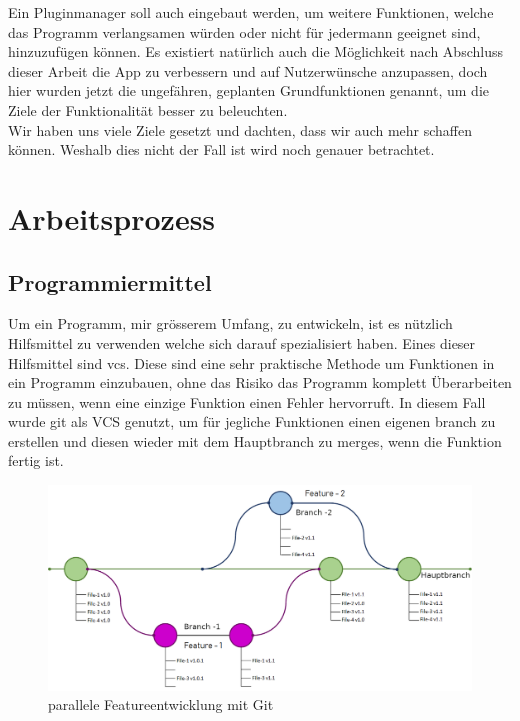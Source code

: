 \documentclass[a4paper,11pt]{article}
\begin{document}
Ein Pluginmanager soll auch eingebaut werden, um weitere Funktionen, welche das Programm verlangsamen würden oder nicht für jedermann geeignet sind, hinzuzufügen können. Es existiert natürlich auch die Möglichkeit nach Abschluss dieser Arbeit die App zu verbessern und auf Nutzerwünsche anzupassen, doch hier wurden jetzt die ungefähren, geplanten Grundfunktionen genannt, um die Ziele der Funktionalität besser zu beleuchten.\\
Wir haben uns viele Ziele gesetzt und dachten, dass wir auch mehr schaffen können. Weshalb dies nicht der Fall ist wird noch genauer betrachtet. 

\newpage

\section{Arbeitsprozess}

\subsection{Programmiermittel}

Um ein Programm, mir grösserem Umfang, zu entwickeln, ist es nützlich Hilfsmittel zu verwenden welche sich darauf spezialisiert haben. 
Eines dieser Hilfsmittel sind \gls{vcs}. Diese sind eine sehr praktische Methode um Funktionen in ein Programm einzubauen, ohne das Risiko 
das Programm komplett Überarbeiten zu müssen, wenn eine einzige Funktion einen Fehler hervorruft. In diesem Fall wurde \Gls{git} als VCS genutzt, um für jegliche Funktionen
einen eigenen \gls{branch} zu erstellen und diesen wieder mit dem Hauptbranch zu \glspl{merge}, wenn die Funktion fertig ist.\cite{git} \cite{github} \\

\begin{figure}[H]
    \centering
    \includegraphics[width=.8\textwidth]{media/gitflow2.png}
    \caption{parallele Featureentwicklung mit Git \cite{gitflowBlog}}
\end{figure}
\end{document}
